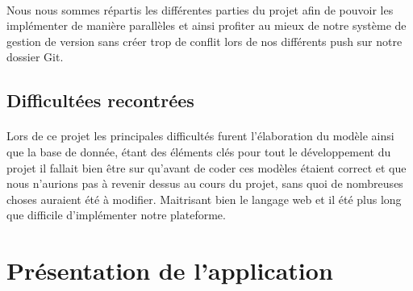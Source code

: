 \documentclass[a4paper, 12pt]{article}
\begin{document}
\paragraph{}Nous nous sommes répartis les différentes parties du projet afin de pouvoir les implémenter de manière parallèles et ainsi profiter au mieux de notre système de gestion de version sans créer trop de conflit lors de nos différents push sur notre dossier Git.

\newpage
\subsection{Difficultées recontrées}
\paragraph{}Lors de ce projet les principales difficultés furent l'élaboration du modèle ainsi que la base de donnée, étant des éléments clés pour tout le développement du projet il fallait bien être sur qu'avant de coder ces modèles étaient correct et que nous n'aurions pas à revenir dessus au cours du projet, sans quoi de nombreuses choses auraient été à modifier. Maitrisant bien le langage web et il été plus long que difficile d'implémenter notre plateforme.

\newpage

\section{Présentation de l'application}
\end{document}
